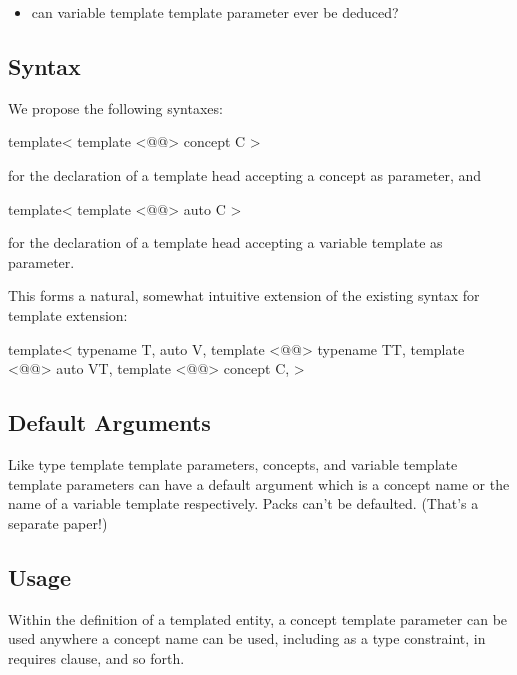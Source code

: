\documentclass{wg21}
\begin{document}
\begin{itemize}
\item can variable template template parameter ever be deduced?
\end{itemize}

\subsection{Syntax}

We propose the following syntaxes:

\begin{colorblock}
template<
    template <@@> concept C
>
\end{colorblock}

for the declaration of a template head accepting a concept as parameter, and

\begin{colorblock}
template<
    template <@@> auto C
>
\end{colorblock}

for the declaration of a template head accepting a variable template as parameter.

This forms a natural, somewhat intuitive extension of the existing syntax for template extension:
\begin{colorblock}
template<
    typename T,
    auto V,
    template <@@> typename TT,
    template <@@> auto VT,
    template <@@> concept C,
>
\end{colorblock}

\subsection{Default Arguments}


Like type template template parameters, concepts, and variable template template
parameters can have a default argument which is a concept name or the name of a variable template respectively.
Packs can't be defaulted. (That's a separate paper!)

\subsection{Usage}

Within the definition of a templated entity, a concept template parameter
can be used anywhere a concept name can be used, including as a type constraint, in requires clause, and so forth.
\end{document}
